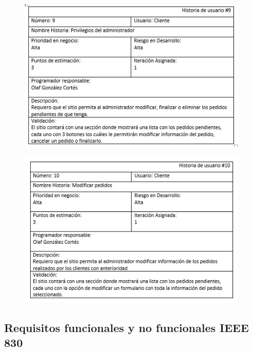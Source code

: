 \begin{figure}[htb]
\begin{center}
\includegraphics[width=11cm]{./imagenes/tablas/HU9.png}
\end{center}

\end{figure}



\begin{figure}[htb]
\begin{center}
\includegraphics[width=11cm]{./imagenes/tablas/HU10.png}
\end{center}

\end{figure}

\newpage

\subsection{Requisitos funcionales y no funcionales IEEE 830}

